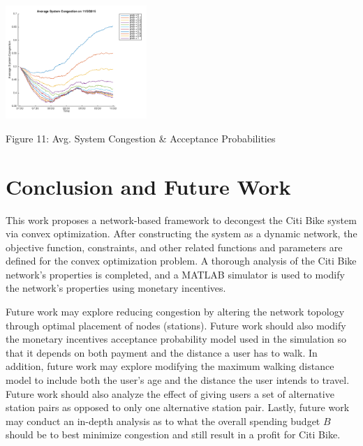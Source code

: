 \documentclass[times, 10pt,twocolumn]{article}
\begin{document}
\hfill \break
\centerline{\includegraphics[width=0.4\textwidth]{m4/System_Congestion_Nov3_Prob.png}}
\centerline{Figure 11: Avg. System Congestion \& Acceptance Probabilities}
\hfill \break




\section{Conclusion and Future Work}
This work proposes a network-based framework to decongest the Citi Bike system via convex optimization. After constructing the system as a dynamic network, the objective function, constraints, and other related functions and parameters are defined for the convex optimization problem. A thorough analysis of the Citi Bike network's properties is completed, and a MATLAB simulator is used to modify the network's properties using monetary incentives.

Future work may explore reducing congestion by altering the network topology through optimal placement of nodes (stations). Future work should also modify the monetary incentives acceptance probability model used in the simulation so that it depends on both payment and the distance a user has to walk. In addition, future work may explore modifying the maximum walking distance model to include both the user's age and the distance the user intends to travel. Future work should also analyze the effect of giving users a set of alternative station pairs as opposed to only one alternative station pair. Lastly, future work may conduct an in-depth analysis as to what the overall spending budget $B$ should be to best minimize congestion and still result in a profit for Citi Bike.
\end{document}
